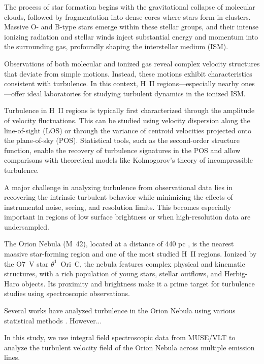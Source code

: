 \documentclass[fleqn,usenatbib, useAMS, a4paper]{mnras}
\begin{document}
The process of star formation begins with the gravitational collapse of molecular clouds, followed by fragmentation into dense cores where stars form in clusters. 
Massive O- and B-type stars emerge within these stellar groups, and their intense ionizing radiation and stellar winds inject substantial energy and momentum into the surrounding gas, profoundly shaping the interstellar medium (ISM).

Observations of both molecular and ionized gas reveal complex velocity structures that deviate from simple motions. 
Instead, these motions exhibit characteristics consistent with turbulence. 
In this context, H~II regions—especially nearby ones—offer ideal laboratories for studying turbulent dynamics in the ionized ISM.

Turbulence in H~II regions is typically first characterized through the amplitude of velocity fluctuations. This can be studied using velocity dispersion along the line-of-sight (LOS) or through the variance of centroid velocities projected onto the plane-of-sky (POS). 
Statistical tools, such as the second-order structure function, enable the recovery of turbulence signatures in the POS and allow comparisons with theoretical models like Kolmogorov’s theory of incompressible turbulence.

A major challenge in analyzing turbulence from observational data lies in recovering the intrinsic turbulent behavior while minimizing the effects of instrumental noise, seeing, and resolution limits.
This becomes especially important in regions of low surface brightness or when high-resolution data are undersampled.

The Orion Nebula (M~42), located at a distance of 440 pc \citetext{\SI{1}{\arcsecond} = \SI{0.002}{pc}; \citealp{2008AJ....136.1566O}}, is the nearest massive star-forming region and one of the most studied H~II regions. 
Ionized by the O7~V star $\theta^1$~Ori~C, the nebula features complex physical and kinematic structures, with a rich population of young stars, stellar outflows, and Herbig-Haro objects. Its proximity and brightness make it a prime target for turbulence studies using spectroscopic observations.

Several works have analyzed turbulence in the Orion Nebula using various statistical methods \citep{von1951methode, munch1958internal, castaneda1988, 1992ApJ...387..229O, 2016MNRAS.455.4057M, arthur2016turbulence, garciav23}. 
However...

In this study, we use integral field spectroscopic data from MUSE/VLT to analyze the turbulent velocity field of the Orion Nebula across multiple emission lines. 
\end{document}
